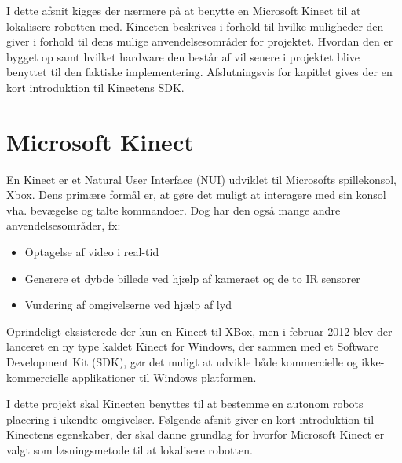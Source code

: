 I dette afsnit kigges der nærmere på at benytte en Microsoft Kinect til at lokalisere robotten med.
Kinecten beskrives i forhold til hvilke muligheder den giver i forhold til dens mulige anvendelsesområder for projektet.
Hvordan den er bygget op samt hvilket hardware den består af vil senere i projektet blive benyttet til den faktiske implementering.
Afslutningsvis for kapitlet gives der en kort introduktion til Kinectens SDK.

 \section{Microsoft Kinect}\label{kinect}
En Kinect er et Natural User Interface (NUI) udviklet til Microsofts spillekonsol, Xbox.
Dens primære formål er, at gøre det muligt at interagere med sin konsol vha. bevægelse og talte kommandoer.
Dog har den også mange andre anvendelsesområder, fx:
%

\begin{itemize}
\item Optagelse af video i real-tid
\item Generere et dybde billede ved hjælp af kameraet og de to IR sensorer
\item Vurdering af omgivelserne ved hjælp af lyd
\end{itemize}

Oprindeligt eksisterede der kun en Kinect til XBox, men i februar 2012 blev der lanceret en ny type kaldet Kinect for Windows, der sammen med et Software Development Kit (SDK), gør det muligt at udvikle både kommercielle og ikke-kommercielle applikationer til Windows platformen.

I dette projekt skal Kinecten benyttes til at bestemme en autonom robots placering i ukendte omgivelser. 
Følgende afsnit giver en kort introduktion til Kinectens egenskaber, der skal danne grundlag for hvorfor Microsoft Kinect er valgt som løsningsmetode til at lokalisere robotten.\cite{kinectProgrammingGuide}

